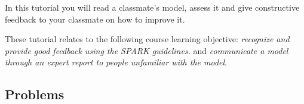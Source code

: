 		\begin{objectives}
			In this tutorial you will read a classmate's model, assess it and give constructive feedback to your classmate on how to improve it.
				
			These tutorial relates to the following course learning objective:
			\textit{recognize and provide good feedback using the SPARK guidelines.} and \textit{communicate a model through an expert report to people unfamiliar with the model}.
		\end{objectives}

		\vspace{-.5em}
		\subsection*{Problems}
		\vspace{-.5em}







